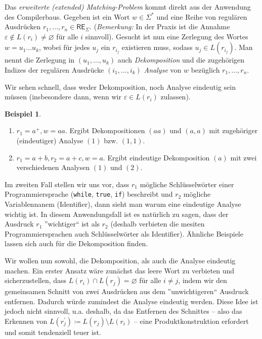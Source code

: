 \documentclass[11pt, a4paper]{article}
\theoremstyle{definition}
\newtheorem{example}[definition]{Beispiel}
\theoremstyle{plain}
\numberwithin{equation}{section}
\let\emptyset\varnothing
\begin{document}
Das \textit{erweiterte (extended) Matching-Problem} kommt direkt aus der Anwendung des Compilerbaus. Gegeben ist ein Wort $w \in \Sigma^\ast$ und eine Reihe von regulären Ausdrücken $r_1, \ldots, r_n \in \mathsf{RE}_\Sigma$. (\textit{Bemerkung:} In der Praxis ist die Annahme $\varepsilon \notin L(r_i) \neq \emptyset$ für alle $i$ sinnvoll). Gesucht ist nun eine Zerlegung des Wortes $w = u_1 \ldots u_k$, wobei für jedes $u_j$ ein $r_{i_j}$ existieren muss, sodass $u_j \in L(r_{i_j})$. Man nennt die Zerlegung in $(u_1, \ldots, u_k)$ auch \textit{Dekomposition} und die zugehörigen Indizes der regulären Ausdrücke $(i_1, \ldots, i_k)$ \textit{Analyse} von $w$ bezüglich $r_1, \ldots, r_n$.

Wir sehen schnell, dass weder Dekomposition, noch Analyse eindeutig sein müssen (insbesondere dann, wenn wir $\varepsilon \in L(r_i)$ zulassen).
\begin{example}
	\begin{enumerate}
		\item $r_1 = a^+, w = aa$. Ergibt Dekompositionen $(aa)$ und $(a, a)$ mit zugehöriger (eindeutiger) Analyse $(1)$ bzw. $(1, 1)$.
		\item $r_1 = a+b, r_2 = a+c, w = a$. Ergibt eindeutige Dekomposition $(a)$ mit zwei verschiedenen Analysen $(1)$ und $(2)$.	
	\end{enumerate}
	Im zweiten Fall stellen wir uns vor, dass $r_1$ mögliche Schlüsselwörter einer Programmiersprache (\texttt{while}, \texttt{true}, \texttt{if}) beschreibt und $r_2$ mögliche Variablennanem (Identifier), dann sieht man warum eine eindeutige Analyse wichtig ist. In diesem Anwendungsfall ist es natürlich zu sagen, dass der Ausdruck $r_1$ ''wichtiger`` ist als $r_2$ (deshalb verbieten die mesiten Programmiersprachen auch Schlüsselwörter als Identifier). Ähnliche Beispiele lassen sich auch für die Dekomposition finden.
\end{example}

Wir wollen nun sowohl, die Dekomposition, als auch die Analyse eindeutig machen. Ein erster Ansatz wäre zunächst das leere Wort zu verbieten und sicherzustellen, dass $L(r_i) \cap L(r_j) = \emptyset$ für alle $i \neq j$, indem wir den gemeinsamen Schnitt von zwei Ausdrücken aus dem ''unwichtigeren`` Ausdruck entfernen. Dadurch würde zumindest die Analyse eindeutig werden. Diese Idee ist jedoch nicht sinnvoll, u.a. deshalb, da das Entfernen des Schnittes -- also das Erkennen von $L(r_j^\prime) \coloneqq L(r_j) \setminus L(r_i)$ -- eine Produktkonstruktion erfordert und somit tendenziell teuer ist.
\end{document}
